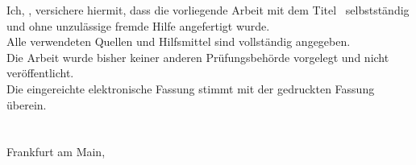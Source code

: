 \begin{declaration}
	\addchaptertocentry{\authorshipname} %
	Ich, \mbox{\authorname}, versichere hiermit, dass die vorliegende Arbeit mit dem Titel \linebreak\glqq\textbf{\ttitle}\grqq~selbstst\"andig und ohne unzul\"assige fremde Hilfe angefertigt wurde.
	\\
	
	Alle verwendeten Quellen und Hilfsmittel sind vollst\"andig angegeben.
	\\
	
	Die Arbeit wurde bisher keiner anderen Pr\"ufungsbeh\"orde vorgelegt und nicht ver\"offentlicht.
	\\
	
	Die eingereichte elektronische Fassung stimmt mit der gedruckten Fassung \"uberein.
	\\[1cm]
	
	\noindent \authorname \\ \\
	\noindent Frankfurt am Main, \submissiondate\\
\end{declaration}





\begin{abstract}
	\addchaptertocentry{\abstractname} %
	
	TODO: Zusammenfassung eintragen.
	
\end{abstract}


